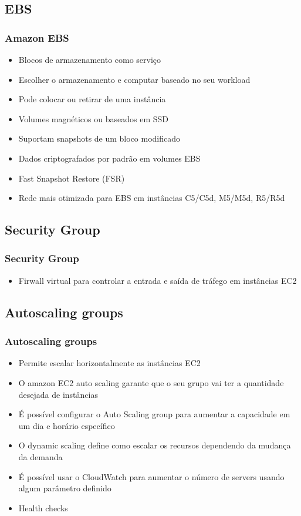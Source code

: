 \subsection{EBS}

\begin{frame}
	\frametitle{Amazon EBS}
	\begin{itemize}
		\item Blocos de armazenamento como serviço
		\item Escolher o armazenamento e computar baseado no seu workload
		\item Pode colocar ou retirar de uma instância
		\item Volumes magnéticos ou baseados em SSD
		\item Suportam snapshots de um bloco modificado
		\item Dados criptografados por padrão em volumes EBS
		\item Fast Snapshot Restore (FSR)
		\item Rede mais otimizada para EBS em instâncias C5/C5d, M5/M5d, R5/R5d
	\end{itemize}
\end{frame}

\subsection{Security Group}

\begin{frame}
	\frametitle{Security Group}
	\begin{itemize}
		\item Firwall virtual para controlar a entrada e saída de tráfego em instâncias EC2
	\end{itemize}
\end{frame}

\subsection{Autoscaling groups}

\begin{frame}
	\frametitle{Autoscaling groups}
	\begin{itemize}
		\item Permite escalar horizontalmente as instâncias EC2
		\item O amazon EC2 auto scaling garante que o seu grupo vai ter a quantidade desejada de instâncias
		\item É possível configurar o Auto Scaling group para aumentar a capacidade em um dia e horário específico
		\item O dynamic scaling define como escalar os recursos dependendo da mudança da demanda
		\item É possível usar o CloudWatch para aumentar o número de servers usando algum parâmetro definido
		\item Health checks
	\end{itemize}
\end{frame}

